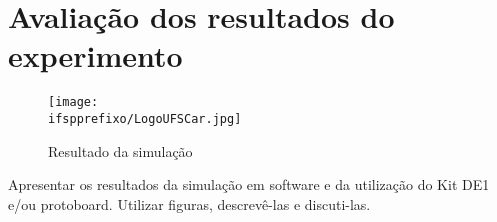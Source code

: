 \chapter{Avaliação dos resultados do experimento}


\begin{figure}[htb]
    \centering
	\caption{\label{fig:printSimulacao}Resultado da simulação}
	\texttt{[image: \\ifspprefixo/LogoUFSCar.jpg]}
\end{figure}

Apresentar os resultados da simulação em software e da utilização do Kit DE1 e/ou
protoboard. Utilizar figuras, descrevê-las e discuti-las.
